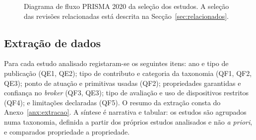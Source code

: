 \begin{figure}[ht]
  \caption{Diagrama de fluxo PRISMA 2020 da seleção dos estudos. A seleção das
    revisões relacionadas está descrita na Secção~\ref{sec:relacionados}.}
  \label{fig:prisma}
\end{figure}

\subsection{Extração de dados}
\label{sec:extracao}

Para cada estudo analisado registaram-se os seguintes itens: ano e tipo de publicação
(QE1, QE2); tipo de contributo e categoria da taxonomia (QF1, QF2, QE3); ponto de
atuação e primitivas usadas (QF2); propriedades garantidas e confiança no
\emph{broker} (QF3, QE3); tipo de avaliação e uso de dispositivos restritos (QF4);
e limitações declaradas (QF5). O resumo da extração consta do
Anexo~\ref{anx:extracao}. A síntese é narrativa e tabular: os estudos são
agrupados numa taxonomia, definida a partir dos próprios estudos analisados e não
\emph{a priori}, e comparados propriedade a propriedade.
